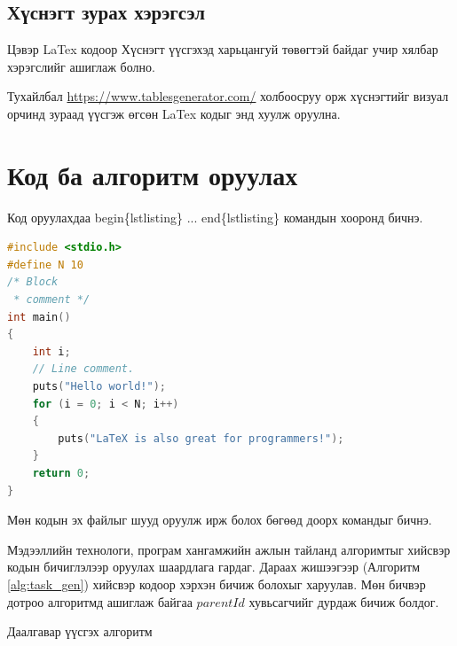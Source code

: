 \documentclass[12pt,A4]{report}
\begin{document}
\section{Хүснэгт зурах хэрэгсэл}
Цэвэр LaTex кодоор Хүснэгт үүсгэхэд харьцангуй төвөгтэй байдаг учир 
хялбар хэрэгслийг ашиглаж болно. 

Тухайлбал \url{https://www.tablesgenerator.com/} холбоосруу орж хүснэгтийг визуал орчинд зураад үүсгэж өгсөн LaTex кодыг энд хуулж оруулна. 

\chapter{Код ба алгоритм оруулах}
Код оруулахдаа begin\{lstlisting\}  ... end\{lstlisting\} командын хооронд бичнэ.

\begin{lstlisting}[language=C, caption=С хэлний кодын жишээ, frame=single]
#include <stdio.h>
#define N 10
/* Block
 * comment */
int main()
{
    int i;
    // Line comment.
    puts("Hello world!");
    for (i = 0; i < N; i++)
    {
        puts("LaTeX is also great for programmers!");
    }
    return 0;
}
\end{lstlisting}

Мөн кодын эх файлыг шууд оруулж ирж болох бөгөөд доорх командыг бичнэ.



Мэдээллийн технологи, програм хангамжийн ажлын тайланд алгоримтыг хийсвэр кодын бичиглэлээр оруулах шаардлага гардаг. Дараах жишээгээр (Алгоритм \ref{alg:task_gen}) хийсвэр кодоор хэрхэн бичиж болохыг харуулав. Мөн бичвэр дотроо алгоритмд ашиглаж байгаа $parentId$ хувьсагчийг дурдаж бичиж болдог.

\makeatletter
\newenvironment{megaalgorithm}[1][htb]{%
    \renewcommand{\ALG@name}{Алгоритм}%
   \begin{algorithm}[#1]%
  }{\end{algorithm}}
\makeatother

\begin{megaalgorithm}
\caption{Даалгавар үүсгэх алгоритм}\label{alg:task_gen}
\end{megaalgorithm}
\end{document}
